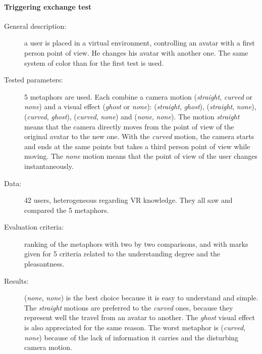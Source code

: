 \documentclass[a4paper]{article}
\begin{document}
\paragraph{Triggering exchange test}
\begin{description}
	\item[General description:] a user is placed in a virtual environment, controlling an avatar with a first person point of view. He changes his avatar with another one. The same system of color than for the first test is used.
	\item[Tested parameters:] 5 metaphors are used. Each combine a camera motion (\textit{straight}, \textit{curved} or \textit{none}) and a visual effect (\textit{ghost} or \textit{none}): (\textit{straight}, \textit{ghost}), (\textit{straight}, \textit{none}), (\textit{curved}, \textit{ghost}), (\textit{curved}, \textit{none}) and (\textit{none}, \textit{none}). The motion \textit{straight} means that the camera directly moves from the point of view of the original avatar to the new one. With the \textit{curved} motion, the camera starts and ends at the same points but takes a third person point of view while moving. The \textit{none} motion means that the point of view of the user changes instantaneously.
	\item[Data:] 42 users, heterogeneous regarding VR knowledge. They all saw and compared   the 5 metaphors.
	\item[Evaluation criteria:] ranking of the metaphors with two by two comparisons, and with marks given for 5 criteria related to the understanding degree and the pleasantness.
	\item[Results:] (\textit{none}, \textit{none}) is the best choice because it is easy to understand and simple. The \textit{straight} motions are preferred to the \textit{curved} ones, because they represent well the travel from an avatar to another. The \textit{ghost} visual effect is also appreciated for the same reason. The worst metaphor is (\textit{curved}, \textit{none}) because of the lack of information it carries and the disturbing camera motion.
\end{description}
\end{document}

